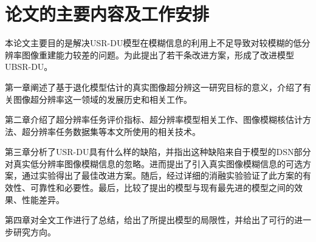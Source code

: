 \section{论文的主要内容及工作安排}
本论文主要目的是解决USR-DU模型在模糊信息的利用上不足导致对较模糊的低分辨率图像重建能力较差的问题。为此提出了若干条改进方案，形成了改进模型UBSR-DU。

第一章阐述了基于退化模型估计的真实图像超分辨这一研究目标的意义，介绍了有关图像超分辨率这一领域的发展历史和相关工作。

第二章介绍了超分辨率任务评价指标、超分辨率模型相关工作、图像模糊核估计方法、超分辨率任务数据集等本文所使用的相关技术。

第三章分析了USR-DU具有什么样的缺陷，并指出这种缺陷来自于模型的DSN部分对真实低分辨率图像模糊信息的忽略。进而提出了引入真实图像模糊信息的可选方案，通过实验得出了最佳改进方案。随后，经过详细的消融实验验证了此方案的有效性、可靠性和必要性。最后，比较了提出的模型与现有最先进的模型之间的效果、性能差异。

第四章对全文工作进行了总结，给出了所提出模型的局限性，并给出了可行的进一步研究方向。